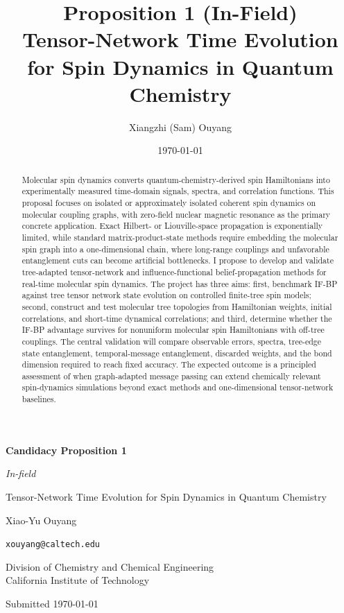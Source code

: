 \documentclass[12pt]{article}
\title{Proposition 1 (In-Field) \\[0.25em]
       \large Tensor-Network Time Evolution for Spin Dynamics in
       Quantum Chemistry}
\author{Xiangzhi (Sam) Ouyang}
\date{\today}
\begin{document}
\begin{titlepage}
  \centering
  \vspace*{2cm}
  {\Large \bfseries Candidacy Proposition 1\par}
  \vspace{0.5cm}
  {\large \textit{In-field}\par}
  \vspace{1.5cm}
  {\LARGE Tensor-Network Time Evolution for Spin Dynamics
          in Quantum Chemistry\par}
  \vspace{2cm}
  {\large Xiao-Yu Ouyang \par}
  \vspace{0.5cm}
  {\normalsize \texttt{xouyang@caltech.edu} \par}
  \vspace{1.5cm}
  {\normalsize Division of Chemistry and Chemical Engineering \\
               California Institute of Technology \par}
  \vfill
  {\normalsize Submitted \today \par}
\end{titlepage}

\begin{singlespace}
\tableofcontents
\end{singlespace}
\newpage

\begin{abstract}
\noindent
Molecular spin dynamics converts quantum-chemistry-derived spin Hamiltonians into experimentally measured time-domain signals, spectra, and correlation functions.
This proposal focuses on isolated or approximately isolated coherent spin dynamics on molecular coupling graphs, with zero-field nuclear magnetic resonance as the primary concrete application.
Exact Hilbert- or Liouville-space propagation is exponentially limited, while standard matrix-product-state methods require embedding the molecular spin graph into a one-dimensional chain, where long-range couplings and unfavorable entanglement cuts can become artificial bottlenecks.
I propose to develop and validate tree-adapted tensor-network and influence-functional belief-propagation methods for real-time molecular spin dynamics.
The project has three aims: first, benchmark IF-BP against tree tensor network state evolution on controlled finite-tree spin models; second, construct and test molecular tree topologies from Hamiltonian weights, initial correlations, and short-time dynamical correlations; and third, determine whether the IF-BP advantage survives for nonuniform molecular spin Hamiltonians with off-tree couplings.
The central validation will compare observable errors, spectra, tree-edge state entanglement, temporal-message entanglement, discarded weights, and the bond dimension required to reach fixed accuracy.
The expected outcome is a principled assessment of when graph-adapted message passing can extend chemically relevant spin-dynamics simulations beyond exact methods and one-dimensional tensor-network baselines.

\end{abstract}
\newpage
\end{document}
